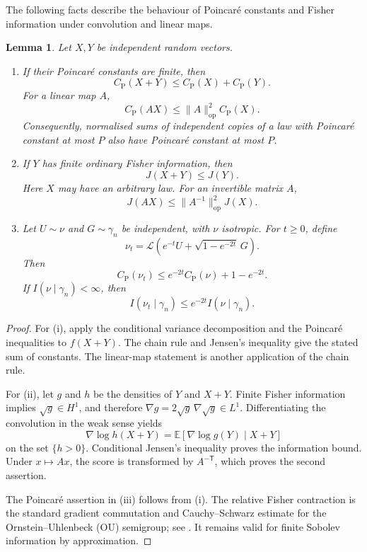 \documentclass[11pt]{amsart}
\numberwithin{equation}{section}
\newtheorem{lemma}[theorem]{Lemma}
\theoremstyle{definition}
\theoremstyle{remark}
\newcommand{\E}{\mathbb E}
\newcommand{\gam}{\gamma_n}
\newcommand{\CP}{C_{\mathrm P}}
\newcommand{\op}{\mathrm{op}}
\newcommand{\norm}[1]{\lVert #1\rVert}
\begin{document}
The following facts describe the behaviour of Poincar\'e constants and
Fisher information under convolution and linear maps.

\begin{lemma}\label{lem:convolution-facts}
Let \(X,Y\) be independent random vectors.
\begin{enumerate}[label=\textup{(\roman*)},leftmargin=2.2em]
\item If their Poincar\'e constants are finite, then
\[
\CP(X+Y)\le\CP(X)+\CP(Y).
\]
For a linear map \(A\),
\[
\CP(AX)\le\norm{A}_{\op}^2\CP(X).
\]
Consequently, normalised sums of independent copies of a law with
Poincar\'e constant at most \(P\) also have Poincar\'e constant at most \(P\).

\item If \(Y\) has finite ordinary Fisher information, then
\[
J(X+Y)\le J(Y).
\]
Here \(X\) may have an arbitrary law.
For an invertible matrix \(A\),
\[
J(AX)\le\norm{A^{-1}}_{\op}^2 J(X).
\]

\item Let \(U\sim\nu\) and \(G\sim\gam\) be independent, with
\(\nu\) isotropic. For \(t\ge0\), define
\[
\nu_t=\mathcal L(e^{-t}U+\sqrt{1-e^{-2t}}\,G).
\]
Then
\[
\CP(\nu_t)\le e^{-2t}\CP(\nu)+1-e^{-2t}.
\]
If \(I(\nu\mid\gam)<\infty\), then
\[
I(\nu_t\mid\gam)\le e^{-2t}I(\nu\mid\gam).
\]
\end{enumerate}
\end{lemma}

\begin{proof}
For (i), apply the conditional variance decomposition and the
Poincar\'e inequalities to \(f(X+Y)\). The chain rule and Jensen's
inequality give the stated sum of constants. The linear-map statement
is another application of the chain rule.

For (ii), let \(g\) and \(h\) be the densities of \(Y\) and \(X+Y\).
Finite Fisher information
implies \(\sqrt g\in H^1\), and therefore
\(\nabla g=2\sqrt g\,\nabla\sqrt g\in L^1\).
Differentiating the convolution in the weak sense yields
\[
\nabla\log h(X+Y)
=\E[\nabla\log g(Y)\mid X+Y]
\]
on the set \(\{h>0\}\). Conditional Jensen's inequality proves the
information bound. Under \(x\mapsto Ax\), the score is transformed by
\(A^{-\mathsf T}\), which proves the second assertion.

The Poincar\'e assertion in (iii) follows from (i). The relative Fisher
contraction is the standard gradient commutation and
Cauchy--Schwarz estimate for the Ornstein--Uhlenbeck (OU) semigroup; see
\cite{BGL14}. It remains valid for finite Sobolev information by
approximation.
\end{proof}
\end{document}
